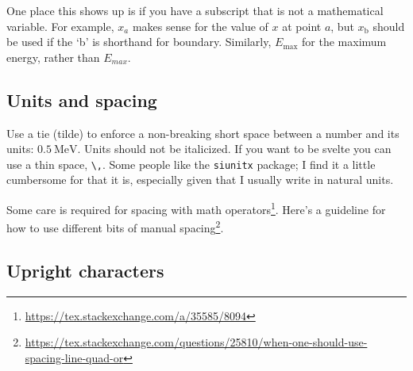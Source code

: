 One place this shows up is if you have a subscript that is not a mathematical variable. For example, $x_a$ makes sense for the value of $x$ at point $a$, but $x_\text{b}$ should be used if the `b' is shorthand for boundary. Similarly, $E_\text{max}$ for the maximum energy, rather than $E_{max}$.


\subsection{Units and spacing}

Use a tie (tilde) to enforce a non-breaking short space between a number and its units: $0.5~\text{MeV}$. Units should not be italicized. If you want to be svelte you can use a thin space, \verb!\,!. Some people like the \texttt{siunitx} package; I find it a little cumbersome for that it is, especially given that I usually write in natural units.

Some care is required for spacing with math operators\footnote{\url{https://tex.stackexchange.com/a/35585/8094}}. Here's a guideline for how to use different bits of manual spacing\footnote{\url{https://tex.stackexchange.com/questions/25810/when-one-should-use-spacing-line-quad-or}}.


\subsection{Upright characters}

